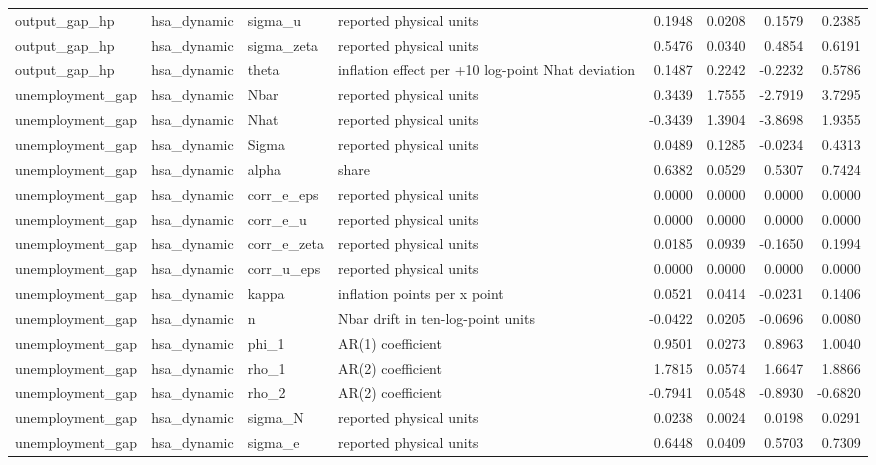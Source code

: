 \begin{tabular}{llllrrrr}
output\_gap\_hp & hsa\_dynamic & sigma\_u & reported physical units & 0.1948 & 0.0208 & 0.1579 & 0.2385 \\
output\_gap\_hp & hsa\_dynamic & sigma\_zeta & reported physical units & 0.5476 & 0.0340 & 0.4854 & 0.6191 \\
output\_gap\_hp & hsa\_dynamic & theta & inflation effect per +10 log-point Nhat deviation & 0.1487 & 0.2242 & -0.2232 & 0.5786 \\
unemployment\_gap & hsa\_dynamic & Nbar & reported physical units & 0.3439 & 1.7555 & -2.7919 & 3.7295 \\
unemployment\_gap & hsa\_dynamic & Nhat & reported physical units & -0.3439 & 1.3904 & -3.8698 & 1.9355 \\
unemployment\_gap & hsa\_dynamic & Sigma & reported physical units & 0.0489 & 0.1285 & -0.0234 & 0.4313 \\
unemployment\_gap & hsa\_dynamic & alpha & share & 0.6382 & 0.0529 & 0.5307 & 0.7424 \\
unemployment\_gap & hsa\_dynamic & corr\_e\_eps & reported physical units & 0.0000 & 0.0000 & 0.0000 & 0.0000 \\
unemployment\_gap & hsa\_dynamic & corr\_e\_u & reported physical units & 0.0000 & 0.0000 & 0.0000 & 0.0000 \\
unemployment\_gap & hsa\_dynamic & corr\_e\_zeta & reported physical units & 0.0185 & 0.0939 & -0.1650 & 0.1994 \\
unemployment\_gap & hsa\_dynamic & corr\_u\_eps & reported physical units & 0.0000 & 0.0000 & 0.0000 & 0.0000 \\
unemployment\_gap & hsa\_dynamic & kappa & inflation points per x point & 0.0521 & 0.0414 & -0.0231 & 0.1406 \\
unemployment\_gap & hsa\_dynamic & n & Nbar drift in ten-log-point units & -0.0422 & 0.0205 & -0.0696 & 0.0080 \\
unemployment\_gap & hsa\_dynamic & phi\_1 & AR(1) coefficient & 0.9501 & 0.0273 & 0.8963 & 1.0040 \\
unemployment\_gap & hsa\_dynamic & rho\_1 & AR(2) coefficient & 1.7815 & 0.0574 & 1.6647 & 1.8866 \\
unemployment\_gap & hsa\_dynamic & rho\_2 & AR(2) coefficient & -0.7941 & 0.0548 & -0.8930 & -0.6820 \\
unemployment\_gap & hsa\_dynamic & sigma\_N & reported physical units & 0.0238 & 0.0024 & 0.0198 & 0.0291 \\
unemployment\_gap & hsa\_dynamic & sigma\_e & reported physical units & 0.6448 & 0.0409 & 0.5703 & 0.7309 \\

\end{tabular}
